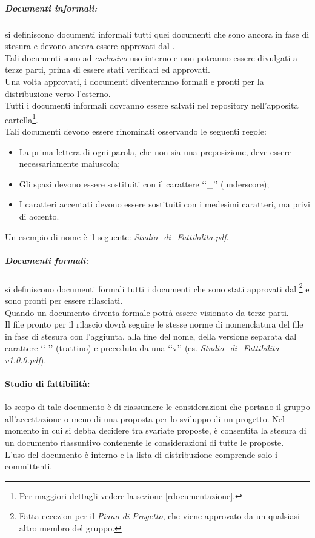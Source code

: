 \subparagraph{Documenti informali:} si definiscono documenti informali tutti quei documenti che sono ancora in fase di stesura e devono ancora essere approvati dal \projectManager{}.
\\Tali documenti sono ad \emph{esclusivo} uso interno e non potranno essere divulgati a terze parti, prima di essere stati verificati ed approvati.
\\Una volta approvati, i documenti diventeranno formali e pronti per la distribuzione verso l'esterno.
\\Tutti i documenti informali dovranno essere salvati nel repository\glossario{} nell'apposita cartella\footnote{Per maggiori dettagli vedere la sezione \ref{rdocumentazione}.}.
\\Tali documenti devono essere rinominati osservando le seguenti regole: 
\begin{itemize}
\item La prima lettera di ogni parola, che non sia una preposizione, deve essere necessariamente maiuscola;
\item Gli spazi devono essere sostituiti con il carattere \lq\lq{}\_{}\rq\rq{} (underscore);
\item I caratteri accentati devono essere sostituiti con i medesimi caratteri, ma privi di accento.
\end{itemize}
Un esempio di nome è il seguente: \emph{Studio\_di\_Fattibilita.pdf}.

\subparagraph{Documenti formali:} si definiscono documenti formali tutti i documenti che sono stati approvati dal \projectManager{}\footnote{Fatta eccezion per il \emph{Piano di Progetto}, che viene approvato da un qualsiasi altro membro del gruppo.} e sono pronti per essere rilasciati.
\\Quando un documento diventa formale potrà essere visionato da terze parti.
\\Il file pronto per il rilascio dovrà seguire le stesse norme di nomenclatura del file in fase di stesura con l'aggiunta, alla fine del nome, della versione separata dal carattere \lq\lq{}-\rq\rq{} (trattino) e preceduta da una \lq\lq{}v\rq\rq{} (es. \emph{Studio\_di\_Fattibilita-v1.0.0.pdf}).

\paragraph{\underline{Studio di fattibilità}:} lo scopo di tale documento è di riassumere le considerazioni che portano il gruppo \authorName{} all'accettazione o meno di una proposta per lo sviluppo di un progetto. Nel momento in cui si debba decidere tra svariate proposte, è consentita la stesura di un documento riassuntivo contenente le considerazioni di tutte le proposte.\\
L'uso del documento è interno e la lista di distribuzione comprende solo i committenti.

